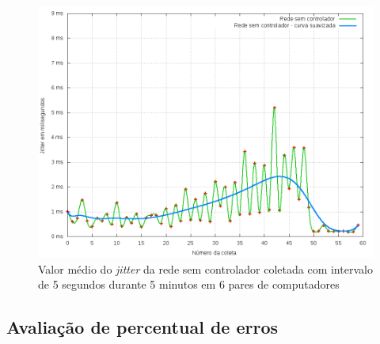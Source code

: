 \begin{figure}[!htb]
    \centering
    \label{fig:jitter-no-ctrl}
    \includegraphics[width=\linewidth]{img/jitter-no-ctrl}
    \caption{Valor médio do \emph{jitter} da rede sem controlador coletada com
    intervalo de 5 segundos durante 5 minutos em 6 pares de computadores}
\end{figure}

\subsection{Avaliação de percentual de erros}




